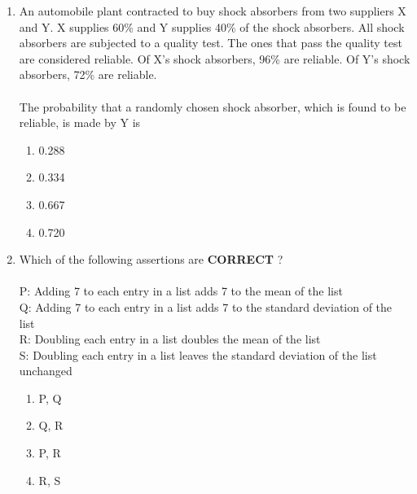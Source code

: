 \documentclass[journal]{IEEEtran}
\begin{document}
\begin{enumerate}
\item An automobile plant contracted to buy shock absorbers from two suppliers X and Y. X supplies 60\% and Y supplies 40\% of the shock absorbers. All shock absorbers are subjected to a quality test. The ones that pass the quality test are considered reliable. Of X's shock absorbers, 96\% are reliable. Of Y's shock absorbers, 72\% are reliable. \\\\
The probability that a randomly chosen shock absorber, which is found to be reliable, is made by Y is
  \begin{enumerate}
   \item 0.288
   \item 0.334
   \item 0.667
   \item 0.720 \\
\end{enumerate}
\item Which of the following assertions are \textbf{CORRECT} ? \\\\
P: Adding 7 to each entry in a list adds 7 to the mean of the list\\
Q: Adding 7 to each entry in a list adds 7 to the standard deviation of the list\\
R: Doubling each entry in a list doubles the mean of the list\\
S: Doubling each entry in a list leaves the standard deviation of the list unchanged
\begin{enumerate}
    \item P, Q
    \item Q, R
    \item P, R
    \item R, S
\end{enumerate}
			 \end{enumerate}
			 
\end{document}
